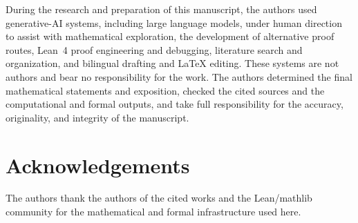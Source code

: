 \documentclass[11pt,letterpaper,reqno]{amsart}
\numberwithin{equation}{section}
\theoremstyle{definition}
\begin{document}
During the research and preparation of this manuscript, the authors used
generative-AI systems, including large language models, under human
direction to assist with mathematical exploration, the development of
alternative proof routes, Lean~4 proof engineering and debugging,
literature search and organization, and bilingual drafting and LaTeX
editing.  These systems are not authors and bear no responsibility for the
work.  The authors determined the final mathematical statements and
exposition, checked the cited sources and the computational and formal
outputs, and take full responsibility for the accuracy, originality, and
integrity of the manuscript.

\section*{Acknowledgements}

The authors thank the authors of the cited works and the Lean/mathlib
community for the mathematical and formal infrastructure used here.



\end{document}
